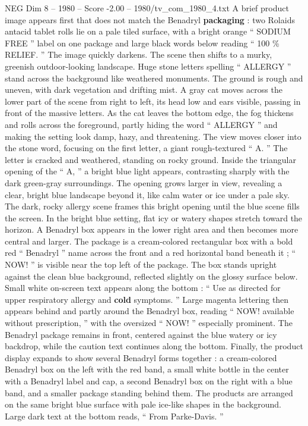 \begin{textsample}{NEG Dim 8 – 1980 – Score -2.00 – 1980/tv\_com\_1980\_4.txt}  \label{ex:f8_neg_056}
A brief product image appears first that does not match the Benadryl \textbf{packaging} : two Rolaids antacid tablet rolls lie on a pale tiled surface, with a bright orange “ SODIUM FREE ” label on one package and large black words below reading “ 100 \% RELIEF. ” The image quickly darkens.
The scene then shifts to a murky, greenish outdoor-looking landscape.
Huge stone letters spelling “ ALLERGY ” stand across the background like weathered monuments.
The ground is rough and uneven, with dark vegetation and drifting mist.
A gray cat moves across the lower part of the scene from right to left, its head low and ears visible, passing in front of the massive letters.
As the cat leaves the bottom edge, the fog thickens and rolls across the foreground, partly hiding the word “ ALLERGY ” and making the setting look damp, hazy, and threatening.
The view moves closer into the stone word, focusing on the first letter, a giant rough-textured “ A. ” The letter is cracked and weathered, standing on rocky ground.
Inside the triangular opening of the “ A, ” a bright blue light appears, contrasting sharply with the dark green-gray surroundings.
The opening grows larger in view, revealing a clear, bright blue landscape beyond it, like calm water or ice under a pale sky.
The dark, rocky allergy scene frames this bright opening until the blue scene fills the screen.
In the bright blue setting, flat icy or watery shapes stretch toward the horizon.
A Benadryl box appears in the lower right area and then becomes more central and larger.
The package is a cream-colored rectangular box with a bold red “ Benadryl ” name across the front and a red horizontal band beneath it ; “ NOW! ” is visible near the top left of the package.
The box stands upright against the clean blue background, reflected slightly on the glossy surface below.
Small white on-screen text appears along the bottom : “ Use as directed for upper respiratory allergy and \textbf{cold} symptoms. ” Large magenta lettering then appears behind and partly around the Benadryl box, reading “ NOW! available without prescription, ” with the oversized “ NOW! ” especially prominent.
The Benadryl package remains in front, centered against the blue watery or icy backdrop, while the caution text continues along the bottom.
Finally, the product display expands to show several Benadryl forms together : a cream-colored Benadryl box on the left with the red band, a small white bottle in the center with a Benadryl label and cap, a second Benadryl box on the right with a blue band, and a smaller package standing behind them.
The products are arranged on the same bright blue surface with pale ice-like shapes in the background.
Large dark text at the bottom reads, “ From Parke-Davis. ”

\end{textsample}
